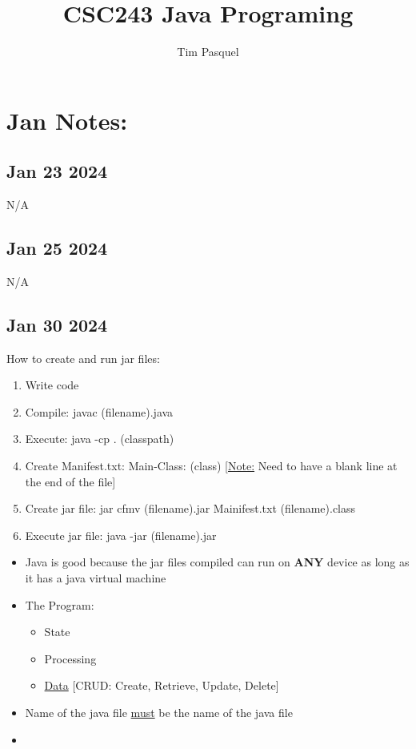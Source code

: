 \documentclass[12pt]{article}
\author{Tim Pasquel}
\title{CSC243 Java Programing}
\begin{document}
\maketitle

\titlepage

\section{Jan Notes:}

\subsection{Jan 23 2024}

N/A

\subsection{Jan 25 2024}

N/A

\subsection{Jan 30 2024}

How to create and run jar files:

\begin{enumerate}
		  \item Write code 
		  \item Compile: javac (filename).java
		  \item Execute: java -cp . (classpath)
		  \item Create Manifest.txt: Main-Class: (class) [\underline{Note:} Need to have a blank line 
					 at the end of the file]
		  \item Create jar file: jar cfmv (filename).jar Mainifest.txt (filename).class
		  \item Execute jar file: java -jar (filename).jar
\end{enumerate}

\begin{itemize}
		  \item Java is good because the jar files compiled can run on \textbf{ANY} device
					 as long as it has a java virtual machine
		  \item The Program:
					 \begin{itemize}
								\item State
								\item Processing
								\item \underline{Data} [CRUD: Create, Retrieve, Update, Delete]
					 \end{itemize}
		  \item Name of the java file \underline{must} be the name of the java file
\end{itemize}

\begin{itemize}
		  \item 
\end{itemize}
\end{document}
